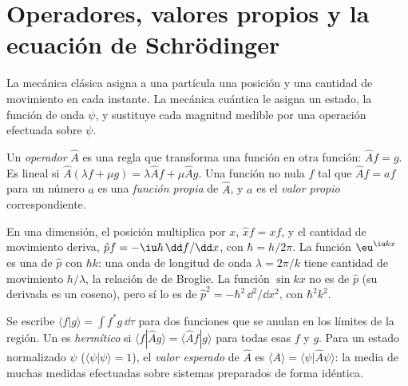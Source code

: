 \section{Operadores, valores propios y la ecuación de Schrödinger}

La mecánica clásica asigna a una partícula una posición y una cantidad de movimiento en cada
instante. La mecánica cuántica le asigna un estado, la función de onda $\psi$, y
sustituye cada magnitud medible por una operación efectuada sobre $\psi$.

\begin{definition}\label{def:b3:quantum-model-systems:operator}
Un \emph{operador} $\hat A$ es una regla que transforma una función
en otra función: $\hat A f = g$. Es lineal si $\hat A(\lambda f +
\mu g) = \lambda\hat Af + \mu\hat Ag$. Una función no nula $f$ tal que
$\hat Af = a f$ para un número $a$ es una \emph{función propia}
de $\hat A$, y $a$ es el \emph{valor propio} correspondiente.
\end{definition}

\begin{example}\label{ex:b3:quantum-model-systems:xp}
En una dimensión, el  posición multiplica por $x$, $\hat x f = xf$,
y el  cantidad de movimiento deriva, $\hat p f = -\iu\hbar\,
\dd f/\dd x$, con $\hbar = h/2\pi$. La función $\eu^{\iu kx}$ es una
 de $\hat p$ con  $\hbar k$: una onda de longitud de onda
$\lambda = 2\pi/k$ tiene cantidad de movimiento $h/\lambda$, la relación de de Broglie.
La función $\sin kx$ no es  de $\hat p$ (su derivada es
un coseno), pero sí lo es de $\hat p^2 = -\hbar^2\,\dd^2/\dd x^2$, con
 $\hbar^2k^2$.
\end{example}

\begin{definition}\label{def:b3:quantum-model-systems:hermitian}
Se escribe $\langle f|g\rangle = \int f^*g\,\dd\tau$ para dos funciones que se anulan
en los límites de la región. Un  es \emph{hermítico}
si $\langle f|\hat Ag\rangle = \langle \hat Af|g\rangle$ para todas esas
$f$ y $g$. Para un estado normalizado $\psi$ ($\langle\psi|\psi\rangle = 1$), el
\emph{valor esperado} de $\hat A$ es
$\langle A\rangle = \langle\psi|\hat A\psi\rangle$: la media de muchas
medidas efectuadas sobre sistemas preparados de forma idéntica.
\end{definition}

